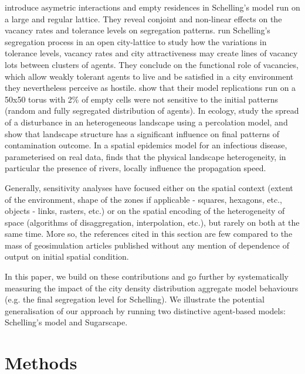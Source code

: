 \documentclass{JASSS}
\begin{document}
\citet{StaufferSolomon2007} introduce asymetric interactions and empty residences in Schelling's model run on a large and regular lattice. They reveal conjoint and non-linear effects on the vacancy rates and tolerance levels on segregation patterns. \citet{Gauvinetal2010} run Schelling's segregation process in an open city-lattice to study how the variations in tolerance levels, vacancy rates and city attractiveness may create lines of vacancy lots between clusters of agents. They conclude on the functional role of vacancies, which allow weakly tolerant agents to live and be satisfied in a city environment they nevertheless perceive as hostile. \citet{HatnaBenenson2012} show that their model replications run on a 50x50 torus with 2\% of empty cells were not sensitive to the initial patterns (random and fully segregated distribution of agents). In ecology, \citet{smith2002predicting} study the spread of a disturbance in an heterogeneous landscape using a percolation model, and show that landscape structure has a significant influence on final patterns of contamination outcome. In a spatial epidemics model for an infectious disease, parameterised on real data, \citet{smith2002predicting} finds that the physical landscape heterogeneity, in particular the presence of rivers, locally influence the propagation speed.

Generally, sensitivity analyses have focused either on the spatial context (extent of the environment, shape of the zones if applicable - squares, hexagons, etc., objects - links, rasters, etc.) or on the spatial encoding of the heterogeneity of space (algorithms of disaggregation, interpolation, etc.), but rarely on both at the same time. More so, the references cited in this section are few compared to the mass of geosimulation articles published without any mention of dependence of output on initial spatial condition.
 
 


In this paper, we build on these contributions and go further by systematically measuring the impact of the city density distribution aggregate model behaviours (e.g. the final segregation level for Schelling). We illustrate the potential generalisation of our approach by running two distinctive agent-based models: Schelling's model and Sugarscape.

\section{Methods}
\end{document}
